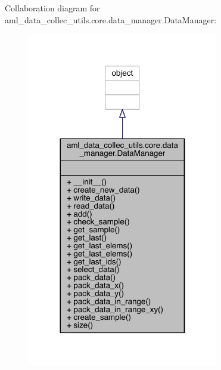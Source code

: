 Collaboration diagram for aml\+\_\+data\+\_\+collec\+\_\+utils.\+core.\+data\+\_\+manager.\+Data\+Manager\+:\nopagebreak
\begin{figure}[H]
\begin{center}
\leavevmode
\includegraphics[width=236pt]{classaml__data__collec__utils_1_1core_1_1data__manager_1_1_data_manager__coll__graph}
\end{center}
\end{figure}
